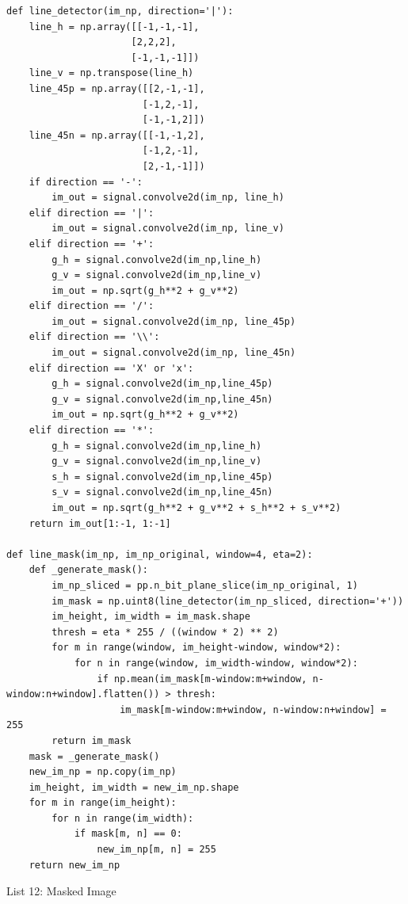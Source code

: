 \documentclass[titlepage]{article}
\begin{document}
\begin{listing}
\begin{verbatim}
def line_detector(im_np, direction='|'):
    line_h = np.array([[-1,-1,-1],
                      [2,2,2],
                      [-1,-1,-1]])
    line_v = np.transpose(line_h)
    line_45p = np.array([[2,-1,-1],
                        [-1,2,-1],
                        [-1,-1,2]])
    line_45n = np.array([[-1,-1,2],
                        [-1,2,-1],
                        [2,-1,-1]])
    if direction == '-':
        im_out = signal.convolve2d(im_np, line_h)
    elif direction == '|':
        im_out = signal.convolve2d(im_np, line_v)
    elif direction == '+':
        g_h = signal.convolve2d(im_np,line_h)
        g_v = signal.convolve2d(im_np,line_v)
        im_out = np.sqrt(g_h**2 + g_v**2)
    elif direction == '/':
        im_out = signal.convolve2d(im_np, line_45p)
    elif direction == '\\':
        im_out = signal.convolve2d(im_np, line_45n)
    elif direction == 'X' or 'x':
        g_h = signal.convolve2d(im_np,line_45p)
        g_v = signal.convolve2d(im_np,line_45n)
        im_out = np.sqrt(g_h**2 + g_v**2)
    elif direction == '*':
        g_h = signal.convolve2d(im_np,line_h)
        g_v = signal.convolve2d(im_np,line_v)
        s_h = signal.convolve2d(im_np,line_45p)
        s_v = signal.convolve2d(im_np,line_45n)
        im_out = np.sqrt(g_h**2 + g_v**2 + s_h**2 + s_v**2)
    return im_out[1:-1, 1:-1]

def line_mask(im_np, im_np_original, window=4, eta=2):
    def _generate_mask():
        im_np_sliced = pp.n_bit_plane_slice(im_np_original, 1)
        im_mask = np.uint8(line_detector(im_np_sliced, direction='+'))
        im_height, im_width = im_mask.shape
        thresh = eta * 255 / ((window * 2) ** 2)
        for m in range(window, im_height-window, window*2):
            for n in range(window, im_width-window, window*2):
                if np.mean(im_mask[m-window:m+window, n-window:n+window].flatten()) > thresh:
                    im_mask[m-window:m+window, n-window:n+window] = 255
        return im_mask
    mask = _generate_mask()
    new_im_np = np.copy(im_np)
    im_height, im_width = new_im_np.shape
    for m in range(im_height):
        for n in range(im_width):
            if mask[m, n] == 0:
                new_im_np[m, n] = 255
    return new_im_np 
\end{verbatim}
\centering
\caption{List 12: Masked Image}
\newline
\end{listing}
\end{document}
